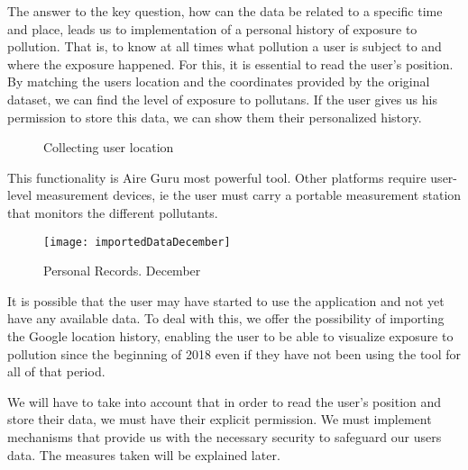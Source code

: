   The answer to the key question, how can the data be related to a specific time and place, leads us to
  implementation of a personal history of exposure to pollution. That is, to know at all times what pollution
  a user is subject to and where the exposure happened.
  For this, it is essential to read the user's position. By matching the users location and the coordinates provided by the original dataset, we can find the level of exposure to pollutans.
  If the user gives us his permission to store this data, we can show them their personalized history.
    \begin{figure}[ht]
      \centering 
        \caption{Collecting user location}
      \end{figure}

      This functionality is Aire Guru most powerful tool. Other platforms require user-level measurement devices, ie the user must carry
      a portable measurement station that monitors the different pollutants. \\
      \begin{figure}[ht]
         \centering
         \texttt{[image: importedDataDecember]}
         \caption{Personal Records. December}
     \end{figure}
     It is possible that the user may have started to use the application and not yet have any available data.
   To deal with this, we offer the possibility of importing the Google location history, enabling the user to be able to visualize
    exposure to pollution since the beginning of 2018 even if they have not been using the tool for  all of that period.
     
     We will have to take into account that in order to read the user's position and store their data, we must
     have their explicit permission. We must implement mechanisms that provide us with the necessary security to safeguard our users data. The measures taken will be explained later.
     
